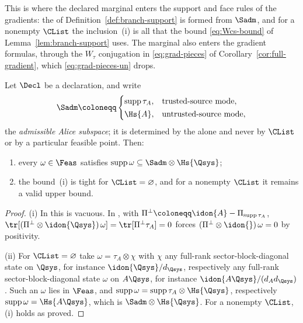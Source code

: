 
This is where the declared marginal enters the support and face rules of the
gradients: the  of
Definition~\ref{def:branch-support} is formed from $\Sadm$, and for a
nonempty $\CList$ the inclusion~(i) is all that the bound
\eqref{eq:Wcs-bound} of Lemma~\ref{lem:branch-support} uses.
The marginal also enters the gradient formulas, through the $W_{\tau}$
conjugation in \eqref{eq:grad-pieces} of
Corollary~\ref{cor:full-gradient}, which \eqref{eq:grad-pieces-un} drops.

\begin{lemma}\label{lem:admissible-alice-subspace}
Let $\Decl$ be a declaration, and write
\begin{equation}\label{eq:SA}
  \Sadm\coloneqq
  \begin{cases}
    \operatorname{supp}\tau_A, & \text{trusted-source mode},\\[0.3ex]
    \Hs{A}, & \text{untrusted-source mode},
  \end{cases}
\end{equation}
the \emph{admissible Alice subspace}; it is determined by the
 alone and never by $\CList$ or by a particular feasible
point. Then:
\begin{enumerate}[label=(\roman*),leftmargin=2.2em]
\item every $\omega\in\Feas$ satisfies
$\operatorname{supp}\omega\subseteq\Sadm\otimes\Hs{\Qsys}$;
\item the bound~(i) is tight for $\CList=\varnothing$, and for a nonempty
$\CList$ it remains a valid upper bound.
\end{enumerate}
\end{lemma}

\begin{proof}
(i) In  this is vacuous. In
, with
$\Pi^{\perp}\coloneqq\idon{A}-\Pi_{\operatorname{supp}\tau_A}$,
$\tr[(\Pi^{\perp}\otimes\idon{\Qsys})\,\omega]=\tr[\Pi^{\perp}\tau_A]=0$
forces $(\Pi^{\perp}\otimes\idon{})\,\omega=0$ by positivity.

(ii) For $\CList=\varnothing$ take $\omega=\tau_A\otimes\chi$ with $\chi$ any
full-rank sector-block-diagonal state on $\Qsys$, for instance
$\idon{\Qsys}/d_{\Qsys}$, respectively any full-rank sector-block-diagonal
state $\omega$ on $A\Qsys$, for instance $\idon{A\Qsys}/(d_Ad_{\Qsys})$.
Such an $\omega$ lies in $\Feas$, and
$\operatorname{supp}\omega=\operatorname{supp}\tau_A\otimes\Hs{\Qsys}$,
respectively $\operatorname{supp}\omega=\Hs{A\Qsys}$, which is
$\Sadm\otimes\Hs{\Qsys}$. For a nonempty $\CList$, (i) holds as proved.
\end{proof}
